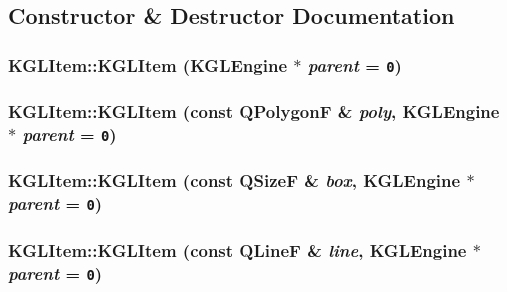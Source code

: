 \subsection{Constructor \& Destructor Documentation}
\hypertarget{class_k_g_l_item_5ccd50011902e82584b676c5ffd6d5c0}{
\subsubsection[{KGLItem}]{\setlength{\rightskip}{0pt plus 5cm}KGLItem::KGLItem ({\bf KGLEngine} $\ast$ {\em parent} = {\tt 0})}}
\label{class_k_g_l_item_5ccd50011902e82584b676c5ffd6d5c0}


\hypertarget{class_k_g_l_item_0c2b3f2c4ee76fb09d58e95d75a0f12f}{
\subsubsection[{KGLItem}]{\setlength{\rightskip}{0pt plus 5cm}KGLItem::KGLItem (const QPolygonF \& {\em poly}, \/  {\bf KGLEngine} $\ast$ {\em parent} = {\tt 0})}}
\label{class_k_g_l_item_0c2b3f2c4ee76fb09d58e95d75a0f12f}


\hypertarget{class_k_g_l_item_6a49457d29817772b0c05f471f3e8777}{
\subsubsection[{KGLItem}]{\setlength{\rightskip}{0pt plus 5cm}KGLItem::KGLItem (const QSizeF \& {\em box}, \/  {\bf KGLEngine} $\ast$ {\em parent} = {\tt 0})}}
\label{class_k_g_l_item_6a49457d29817772b0c05f471f3e8777}


\hypertarget{class_k_g_l_item_f1a9f58e453406da21e2db2e8a76bda1}{
\subsubsection[{KGLItem}]{\setlength{\rightskip}{0pt plus 5cm}KGLItem::KGLItem (const QLineF \& {\em line}, \/  {\bf KGLEngine} $\ast$ {\em parent} = {\tt 0})}}
\label{class_k_g_l_item_f1a9f58e453406da21e2db2e8a76bda1}


